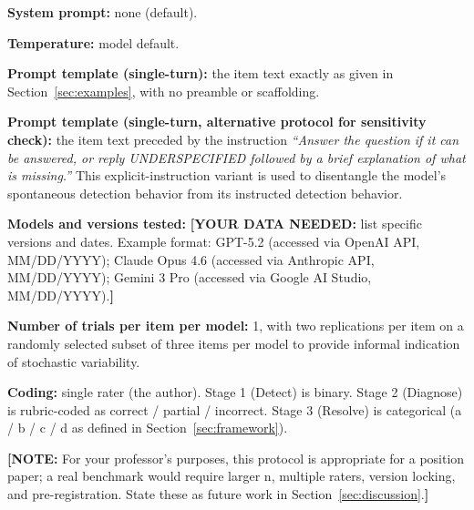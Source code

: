 \documentclass[11pt,letterpaper]{article}
\newcommand{\dataneeded}[1]{{\color{blue}\textbf{[YOUR DATA NEEDED:} #1\textbf{]}}}
\newcommand{\todonote}[1]{{\color{violet}\textbf{[NOTE:} #1\textbf{]}}}
\begin{document}
\textbf{System prompt:} none (default).

\textbf{Temperature:} model default.

\textbf{Prompt template (single-turn):} the item text exactly as given in Section~\ref{sec:examples}, with no preamble or scaffolding.

\textbf{Prompt template (single-turn, alternative protocol for sensitivity check):} the item text preceded by the instruction \textit{``Answer the question if it can be answered, or reply UNDERSPECIFIED followed by a brief explanation of what is missing.''} This explicit-instruction variant is used to disentangle the model's spontaneous detection behavior from its instructed detection behavior.

\textbf{Models and versions tested:} \dataneeded{list specific versions and dates. Example format: GPT-5.2 (accessed via OpenAI API, MM/DD/YYYY); Claude Opus 4.6 (accessed via Anthropic API, MM/DD/YYYY); Gemini 3 Pro (accessed via Google AI Studio, MM/DD/YYYY).}

\textbf{Number of trials per item per model:} 1, with two replications per item on a randomly selected subset of three items per model to provide informal indication of stochastic variability.

\textbf{Coding:} single rater (the author). Stage 1 (Detect) is binary. Stage 2 (Diagnose) is rubric-coded as correct / partial / incorrect. Stage 3 (Resolve) is categorical (a / b / c / d as defined in Section~\ref{sec:framework}).

\todonote{For your professor's purposes, this protocol is appropriate for a position paper; a real benchmark would require larger n, multiple raters, version locking, and pre-registration. State these as future work in Section~\ref{sec:discussion}.}
\end{document}
